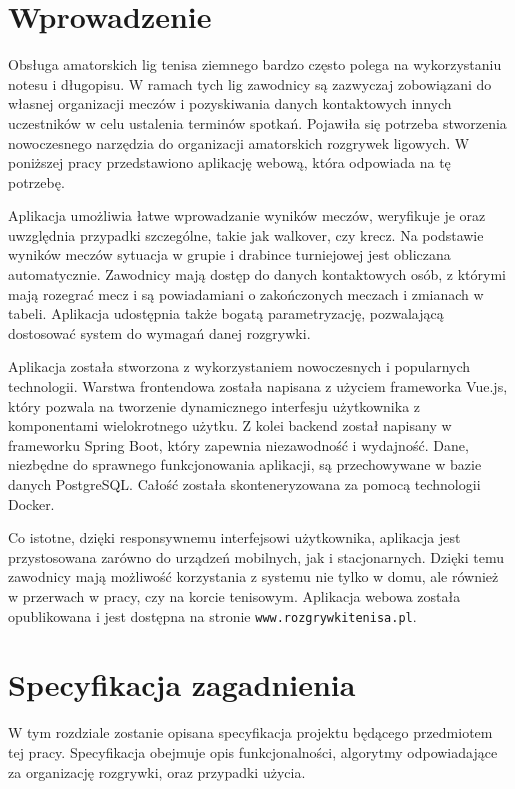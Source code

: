 \documentclass[shortabstract]{iithesis}
\author         {Marcin Wróbel}
\begin{document}

\chapter{Wprowadzenie}
Obsługa amatorskich lig tenisa ziemnego bardzo często polega na wykorzystaniu notesu i długopisu.
W ramach tych lig zawodnicy są zazwyczaj zobowiązani do własnej organizacji meczów i pozyskiwania danych kontaktowych innych uczestników w celu ustalenia terminów spotkań.
Pojawiła się potrzeba stworzenia nowoczesnego narzędzia do organizacji amatorskich rozgrywek ligowych.
W poniższej pracy przedstawiono aplikację webową, która odpowiada na tę potrzebę.
\par
Aplikacja umożliwia łatwe wprowadzanie wyników meczów, weryfikuje je oraz uwzględnia przypadki szczególne, takie jak walkover, czy krecz.
Na podstawie wyników meczów sytuacja w grupie i drabince turniejowej jest obliczana automatycznie.
Zawodnicy mają dostęp do danych kontaktowych osób, z którymi mają rozegrać mecz i są powiadamiani o zakończonych meczach i zmianach w tabeli.
Aplikacja udostępnia także bogatą parametryzację, pozwalającą dostosować system do wymagań danej rozgrywki.
\par
Aplikacja została stworzona z wykorzystaniem nowoczesnych i popularnych technologii.
Warstwa frontendowa została napisana z użyciem frameworka Vue.js, który pozwala na tworzenie dynamicznego interfesju użytkownika z komponentami wielokrotnego użytku.
Z kolei backend został napisany w frameworku Spring Boot, który zapewnia niezawodność i wydajność.
Dane, niezbędne do sprawnego funkcjonowania aplikacji, są przechowywane w bazie danych PostgreSQL.
Całość została skonteneryzowana za pomocą technologii Docker.
\par
Co istotne, dzięki responsywnemu interfejsowi użytkownika, aplikacja jest przystosowana zarówno do urządzeń mobilnych, jak i stacjonarnych.
Dzięki temu zawodnicy mają możliwość korzystania z systemu nie tylko w domu, ale również w przerwach w pracy, czy na korcie tenisowym.
Aplikacja webowa została opublikowana i jest dostępna na stronie \texttt{www.rozgrywkitenisa.pl}.
\par

\chapter{Specyfikacja zagadnienia}
W tym rozdziale zostanie opisana specyfikacja projektu będącego przedmiotem tej pracy.
Specyfikacja obejmuje opis funkcjonalności, algorytmy odpowiadające za organizację rozgrywki, oraz przypadki użycia.
\end{document}
